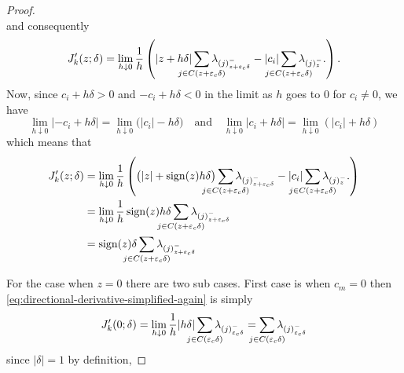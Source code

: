 \begin{proof}
\[  \]
  and consequently
  \begin{equation}
    \label{eq:directional-derivative-simplified-again}
    J'_k(z; \delta)
    = \lim_{h \downarrow 0} \frac{1}{h}
    \left(
      |z + h\delta|\smashoperator{\sum_{j \in C(z + {\varepsilon_c}\delta)}} \lambda_{(j)^-_{z + {\varepsilon_c}\delta}}
      - |c_i| \smashoperator{\sum_{j \in C(z + {\varepsilon_c}\delta)}} \lambda_{(j)^-_{z}}.
    \right).
  \end{equation}
  Now, since \(c_i + h \delta > 0\) and \(-c_i + h \delta < 0\) in the limit as
  \(h\) goes to \(0\) for \(c_i \neq 0\), we have
  \[
    \lim_{h\downarrow 0} |-c_i + h \delta|
    = \lim_{h\downarrow 0}\big( |c_i| -h \delta\big)
    \quad\text{and}\quad
    \lim_{h\downarrow 0} |c_i + h \delta|
    = \lim_{h\downarrow 0}(|c_i| + h \delta)
  \]
  which means that
  \begin{align*}
    J'_k(z; \delta)
     & = \lim_{h \downarrow 0} \frac{1}{h}
    \left(
      \big(|z| + \sign(z)h\delta\big)\smashoperator{\sum_{j \in C(z + {\varepsilon_c}\delta)}} \lambda_{(j)^-_{z + {\varepsilon_c}\delta}}
      - |c_i| \smashoperator{\sum_{j \in C(z + {\varepsilon_c}\delta)}} \lambda_{(j)^-_{z}}.
    \right)                                                                                                                  \\
     & = \lim_{h \downarrow 0} \frac{1}{h}
    \sign(z)h\delta\smashoperator{\sum_{j \in C(z + {\varepsilon_c}\delta)}} \lambda_{(j)^-_{z + {\varepsilon_c}\delta}}     \\
     & = \sign(z)\delta\smashoperator{\sum_{j \in C(z + {\varepsilon_c}\delta)}} \lambda_{(j)^-_{z + {\varepsilon_c}\delta}} \\
  \end{align*}

For the case when $z=0$ there are two sub cases.
  First case is when \(c_m = 0\)  then
  \eqref{eq:directional-derivative-simplified-again} is simply
  \begin{equation*}
    \label{eq:directional-derivative-zerocase}
    J'_k(0; \delta)
    = \lim_{h \downarrow 0} \frac{1}{h}
    |h\delta|\smashoperator{\sum_{j \in C({\varepsilon_c}\delta)}} \lambda_{(j)^-_{{\varepsilon_c}\delta}}
    = \smashoperator{\sum_{j \in C({\varepsilon_c}\delta)}} \lambda_{(j)^-_{{\varepsilon_c}\delta}}
  \end{equation*}
  since \(|\delta| = 1\) by definition,


\end{proof}
